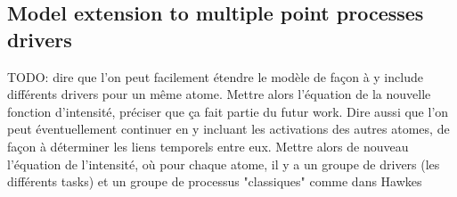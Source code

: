 \subsection{Model extension to multiple point processes drivers}\label{model_extension_multiple_pp}

TODO: dire que l'on peut facilement étendre le modèle de façon à y include différents drivers pour un même atome. Mettre alors l'équation de la nouvelle fonction d'intensité, préciser que ça fait partie du futur work. Dire aussi que l'on peut éventuellement continuer en y incluant les activations des autres atomes, de façon à déterminer les liens temporels entre eux. Mettre alors de nouveau l'équation de l'intensité, où pour chaque atome, il y a un groupe de drivers (les différents tasks) et un groupe de processus "classiques" comme dans Hawkes